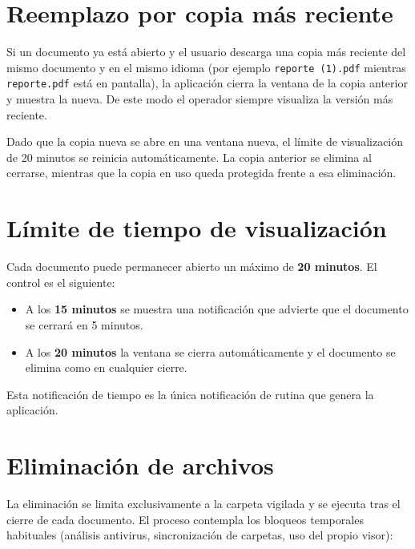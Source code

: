 \documentclass[11pt,a4paper]{article}
\begin{document}
\section{Reemplazo por copia más reciente}
Si un documento ya está abierto y el usuario descarga una copia más reciente del
mismo documento y en el mismo idioma (por ejemplo \texttt{reporte (1).pdf}
mientras \texttt{reporte.pdf} está en pantalla), la aplicación cierra la ventana
de la copia anterior y muestra la nueva. De este modo el operador siempre
visualiza la versión más reciente.

Dado que la copia nueva se abre en una ventana nueva, el límite de visualización
de 20 minutos se reinicia automáticamente. La copia anterior se elimina al
cerrarse, mientras que la copia en uso queda protegida frente a esa eliminación.

\section{Límite de tiempo de visualización}
Cada documento puede permanecer abierto un máximo de \textbf{20 minutos}. El
control es el siguiente:

\begin{itemize}[leftmargin=1.4em,itemsep=2pt]
  \item A los \textbf{15 minutos} se muestra una notificación que advierte que el
        documento se cerrará en 5 minutos.
  \item A los \textbf{20 minutos} la ventana se cierra automáticamente y el
        documento se elimina como en cualquier cierre.
\end{itemize}

Esta notificación de tiempo es la única notificación de rutina que genera la
aplicación.

\section{Eliminación de archivos}
La eliminación se limita exclusivamente a la carpeta vigilada y se ejecuta tras
el cierre de cada documento. El proceso contempla los bloqueos temporales
habituales (análisis antivirus, sincronización de carpetas, uso del propio
visor):
\end{document}
